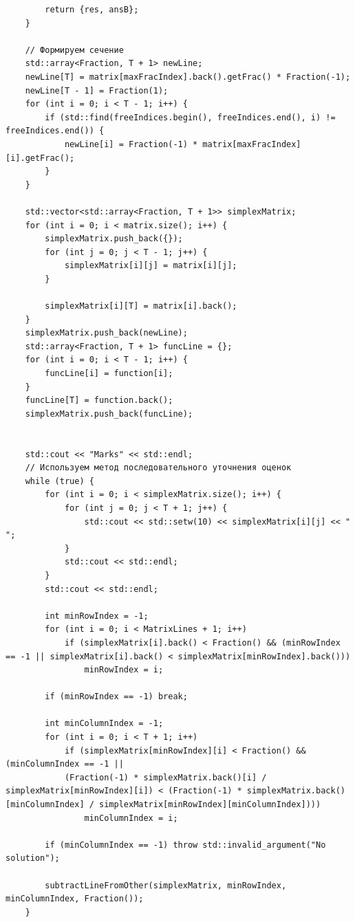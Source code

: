 \documentclass[a4paper,14pt]{extarticle}
\begin{document}
\begin{verbatim}
        return {res, ansB};
    }

    // Формируем сечение
    std::array<Fraction, T + 1> newLine;
    newLine[T] = matrix[maxFracIndex].back().getFrac() * Fraction(-1);
    newLine[T - 1] = Fraction(1);
    for (int i = 0; i < T - 1; i++) {
        if (std::find(freeIndices.begin(), freeIndices.end(), i) != freeIndices.end()) {
            newLine[i] = Fraction(-1) * matrix[maxFracIndex][i].getFrac();
        }
    }

    std::vector<std::array<Fraction, T + 1>> simplexMatrix;
    for (int i = 0; i < matrix.size(); i++) {
        simplexMatrix.push_back({});
        for (int j = 0; j < T - 1; j++) {
            simplexMatrix[i][j] = matrix[i][j];
        }

        simplexMatrix[i][T] = matrix[i].back();
    }
    simplexMatrix.push_back(newLine);
    std::array<Fraction, T + 1> funcLine = {};
    for (int i = 0; i < T - 1; i++) {
        funcLine[i] = function[i];
    }
    funcLine[T] = function.back();
    simplexMatrix.push_back(funcLine);


    std::cout << "Marks" << std::endl;
    // Используем метод последовательного уточнения оценок
    while (true) {
        for (int i = 0; i < simplexMatrix.size(); i++) {
            for (int j = 0; j < T + 1; j++) {
                std::cout << std::setw(10) << simplexMatrix[i][j] << " ";
            }
            std::cout << std::endl;
        }
        std::cout << std::endl;

        int minRowIndex = -1;
        for (int i = 0; i < MatrixLines + 1; i++)
            if (simplexMatrix[i].back() < Fraction() && (minRowIndex == -1 || simplexMatrix[i].back() < simplexMatrix[minRowIndex].back()))
                minRowIndex = i;
        
        if (minRowIndex == -1) break;

        int minColumnIndex = -1;
        for (int i = 0; i < T + 1; i++)
            if (simplexMatrix[minRowIndex][i] < Fraction() && (minColumnIndex == -1 || 
            (Fraction(-1) * simplexMatrix.back()[i] / simplexMatrix[minRowIndex][i]) < (Fraction(-1) * simplexMatrix.back()[minColumnIndex] / simplexMatrix[minRowIndex][minColumnIndex])))
                minColumnIndex = i;

        if (minColumnIndex == -1) throw std::invalid_argument("No solution"); 

        subtractLineFromOther(simplexMatrix, minRowIndex, minColumnIndex, Fraction());
    }


\end{verbatim}
\end{document}
